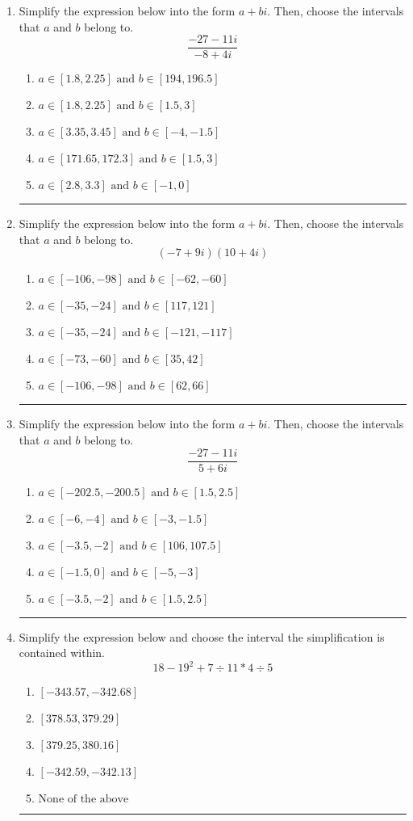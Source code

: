 \documentclass[14pt]{extbook}
\newcommand{\litem}[1]{\item#1\hspace*{-1cm}\rule{\textwidth}{0.4pt}}
\begin{document}
\begin{enumerate}
{\begin{enumerate}[label=\Alph*.]
\end{enumerate} }
\litem{
Simplify the expression below into the form $a+bi$. Then, choose the intervals that $a$ and $b$ belong to.\[ \frac{-27 - 11 i}{-8 + 4 i} \]\begin{enumerate}[label=\Alph*.]
\item \( a \in [1.8, 2.25] \text{ and } b \in [194, 196.5] \)
\item \( a \in [1.8, 2.25] \text{ and } b \in [1.5, 3] \)
\item \( a \in [3.35, 3.45] \text{ and } b \in [-4, -1.5] \)
\item \( a \in [171.65, 172.3] \text{ and } b \in [1.5, 3] \)
\item \( a \in [2.8, 3.3] \text{ and } b \in [-1, 0] \)

\end{enumerate} }
\litem{
Simplify the expression below into the form $a+bi$. Then, choose the intervals that $a$ and $b$ belong to.\[ (-7 + 9 i)(10 + 4 i) \]\begin{enumerate}[label=\Alph*.]
\item \( a \in [-106, -98] \text{ and } b \in [-62, -60] \)
\item \( a \in [-35, -24] \text{ and } b \in [117, 121] \)
\item \( a \in [-35, -24] \text{ and } b \in [-121, -117] \)
\item \( a \in [-73, -60] \text{ and } b \in [35, 42] \)
\item \( a \in [-106, -98] \text{ and } b \in [62, 66] \)

\end{enumerate} }
\litem{
Simplify the expression below into the form $a+bi$. Then, choose the intervals that $a$ and $b$ belong to.\[ \frac{-27 - 11 i}{5 + 6 i} \]\begin{enumerate}[label=\Alph*.]
\item \( a \in [-202.5, -200.5] \text{ and } b \in [1.5, 2.5] \)
\item \( a \in [-6, -4] \text{ and } b \in [-3, -1.5] \)
\item \( a \in [-3.5, -2] \text{ and } b \in [106, 107.5] \)
\item \( a \in [-1.5, 0] \text{ and } b \in [-5, -3] \)
\item \( a \in [-3.5, -2] \text{ and } b \in [1.5, 2.5] \)

\end{enumerate} }
\litem{
Simplify the expression below and choose the interval the simplification is contained within.\[ 18 - 19^2 + 7 \div 11 * 4 \div 5 \]\begin{enumerate}[label=\Alph*.]
\item \( [-343.57, -342.68] \)
\item \( [378.53, 379.29] \)
\item \( [379.25, 380.16] \)
\item \( [-342.59, -342.13] \)
\item \( \text{None of the above} \)


\end{enumerate}}
\end{enumerate}
\end{document}
